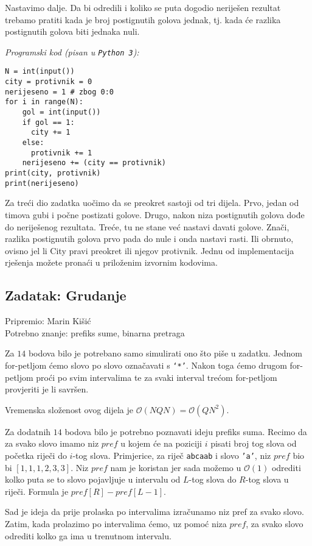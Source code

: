 \documentclass[a4paper]{article}
\begin{document}
Nastavimo dalje. Da bi odredili i koliko se puta dogodio neriješen rezultat
trebamo pratiti kada je broj postignutih golova jednak, tj. kada će razlika
postignutih golova biti jednaka nuli.

\textit{Programski kod (pisan u \texttt{Python 3}):}

\vspace{-2ex}
\begin{verbatim}
N = int(input())
city = protivnik = 0
nerijeseno = 1 # zbog 0:0
for i in range(N):
    gol = int(input())
    if gol == 1:
      city += 1
    else:
      protivnik += 1
    nerijeseno += (city == protivnik)
print(city, protivnik)
print(nerijeseno)
\end{verbatim}

Za treći dio zadatka uočimo da se preokret sastoji od tri dijela. Prvo, jedan
od timova gubi i počne postizati golove. Drugo, nakon niza postignutih golova
dođe do neriješenog rezultata. Treće, tu ne stane već nastavi davati golove.
Znači, razlika postignutih golova prvo pada do nule i onda nastavi rasti. Ili
obrnuto, ovisno jel li City pravi preokret ili njegov protivnik. Jednu od
implementacija rješenja možete pronaći u priloženim izvornim kodovima.

\subsection*{Zadatak: Grudanje}
\textsf{Pripremio: Marin Kišić}\\
\textsf{Potrebno znanje: prefiks sume, binarna pretraga}

Za $14$ bodova bilo je potrebano samo simulirati ono što piše u zadatku. Jednom
for-petljom ćemo slovo po slovo označavati s \texttt{‘*’}. Nakon toga ćemo
drugom for-petljom proći po svim intervalima te za svaki interval trećom
for-petljom provjeriti je li savršen.

Vremenska složenost ovog dijela je $\mathcal{O}(NQN)=\mathcal{O}(QN^2)$.

Za dodatnih $14$ bodova bilo je potrebno poznavati ideju prefiks suma. Recimo
da za svako slovo imamo niz $pref$ u kojem će na poziciji $i$ pisati broj tog
slova od početka riječi do $i$-tog slova. Primjerice, za riječ \texttt{abcaab}
i slovo \texttt{'a'}, niz $pref$ bio bi $[1, 1, 1, 2, 3, 3]$. Niz $pref$ nam je
koristan jer sada možemo u $\mathcal{O}(1)$ odrediti kolko puta se to slovo
pojavljuje u intervalu od
$L$-tog slova do $R$-tog slova u riječi. Formula je $pref[R]-pref[L-1]$.

Sad je ideja da prije prolaska po intervalima izračunamo niz pref za svako
slovo. Zatim, kada prolazimo po intervalima ćemo, uz pomoć niza $pref$, za svako
slovo odrediti kolko ga ima u trenutnom intervalu.
\end{document}
